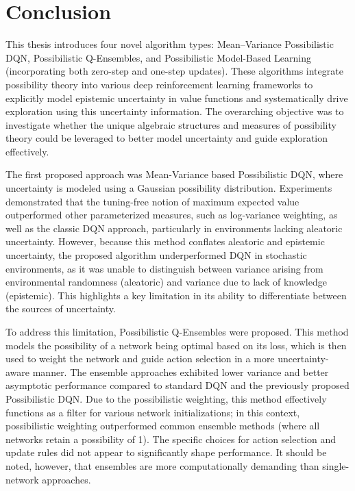 \documentclass[11pt,a4paper]{report}
\begin{document}
\chapter{Conclusion}
\label{chapter:conclusion}
This thesis introduces four novel algorithm types: Mean–Variance Possibilistic DQN, Possibilistic Q-Ensembles, and Possibilistic Model-Based Learning (incorporating both zero-step and one-step updates). These algorithms integrate possibility theory into various deep reinforcement learning frameworks to explicitly model epistemic uncertainty in value functions and systematically drive exploration using this uncertainty information. The overarching objective was to investigate whether the unique algebraic structures and measures of possibility theory could be leveraged to better model uncertainty and guide exploration effectively.

The first proposed approach was Mean-Variance based Possibilistic DQN, where uncertainty is modeled using a Gaussian possibility distribution. Experiments demonstrated that the tuning-free notion of maximum expected value outperformed other parameterized measures, such as log-variance weighting, as well as the classic DQN approach, particularly in environments lacking aleatoric uncertainty. However, because this method conflates aleatoric and epistemic uncertainty, the proposed algorithm underperformed DQN in stochastic environments, as it was unable to distinguish between variance arising from environmental randomness (aleatoric) and variance due to lack of knowledge (epistemic). This highlights a key limitation in its ability to differentiate between the sources of uncertainty.

To address this limitation, Possibilistic Q-Ensembles were proposed. This method models the possibility of a network being optimal based on its loss, which is then used to weight the network and guide action selection in a more uncertainty-aware manner. The ensemble approaches exhibited lower variance and better asymptotic performance compared to standard DQN and the previously proposed Possibilistic DQN. Due to the possibilistic weighting, this method effectively functions as a filter for various network initializations; in this context, possibilistic weighting outperformed common ensemble methods (where all networks retain a possibility of 1). The specific choices for action selection and update rules did not appear to significantly shape performance. It should be noted, however, that ensembles are more computationally demanding than single-network approaches.
\end{document}
